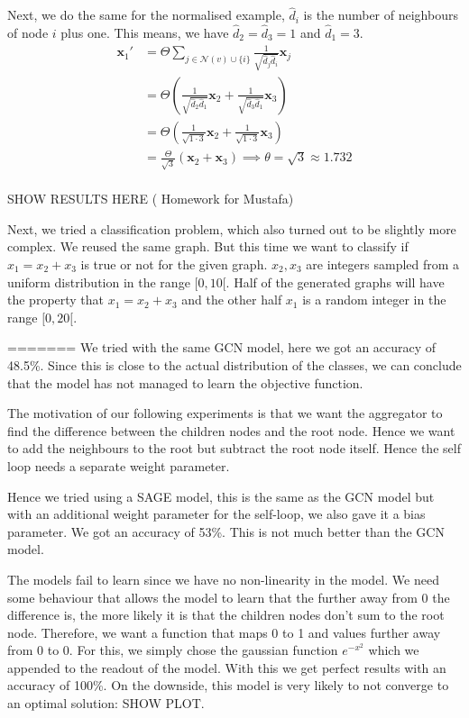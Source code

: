 \documentclass[a4paper,12pt]{article}
\begin{document}
Next, we do the same for the normalised example, $\hat{d}_{i}$ is the number of neighbours of node $i$ plus one. This means, we have $\hat{d}_{2} = \hat{d}_{3} = 1$ and $\hat{d}_{1}=3$.
\begin{align}
  \mathbf{x}_1' &= \Theta \sum_{j \in \mathcal{N}(v) \cup \{i\}} \frac{1}{\sqrt{\hat{d}_j \hat{d}_i}} \mathbf{x}_j\\
  &= \Theta  \left( \frac{1}{\sqrt{\hat{d}_2 \hat{d}_1}} \mathbf{x}_2 +  \frac{1}{\sqrt{\hat{d}_3 \hat{d}_1}} \mathbf{x}_3 \right)\\
  &= \Theta  \left( \frac{1}{\sqrt{1 \cdot 3}} \mathbf{x}_2 +  \frac{1}{\sqrt{1 \cdot 3}} \mathbf{x}_3 \right)\\
  &= \frac{\Theta}{\sqrt{3}}  \left(  \mathbf{x}_2 +   \mathbf{x}_3 \right) \implies \theta = \sqrt{3} \approx 1.732\\
\end{align}

SHOW RESULTS HERE (
Homework for Mustafa)

Next, we tried a classification problem, which also turned out to be slightly more complex. We reused the same graph. But this time we want to classify if $x_{1} = x_{2}+x_{3}$ is true or not for the given graph. \(x_2, x_3\) are integers sampled from a uniform distribution in the range \([0, 10[\). Half of the generated graphs will have the property that \(x_{1} = x_{2}+x_{3}\) and the other half \(x_1\) is a random integer in the range \([0, 20[\).

=======
We tried with the same GCN model, here we got an accuracy of 48.5\%. Since this is close to the actual distribution of the classes, we can conclude that the model has not managed to learn the objective function.

The motivation of our following experiments is that we want the aggregator to find the difference between the children nodes and the root node. Hence we want to add the neighbours to the root but subtract the root node itself. Hence the self loop needs a separate weight parameter.

Hence we tried using a SAGE model, this is the same as the GCN model but with
an additional weight parameter for the self-loop, we also gave it a bias parameter. We got an accuracy of 53\%. %
This is not much better than the GCN model.

The models fail to learn since we have no non-linearity in the model. We need some behaviour
that allows the model to learn that the further away from 0 the difference is,
the more likely it is that the children nodes don't sum to the root node.
Therefore, we want a function that maps 0 to 1 and values further away from 0 to 0. 
For this, we simply chose the gaussian function \(e^{-x^2}\) which we
appended to the readout of the model. With this we get perfect results with an
accuracy of 100\%. On the downside, this model is very likely to not converge to an optimal solution: SHOW PLOT.
\end{document}

